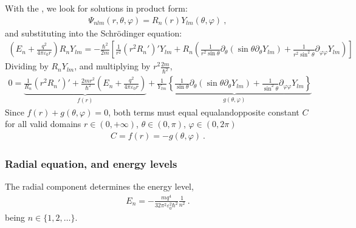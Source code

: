 \documentclass[letterpaper,10pt,english]{jupyterBook}
\begin{document}
\sphinxAtStartPar
With the , we look for solutions in product form:
\begin{equation*}
\begin{split}\Psi_{nlm}(r, \theta, \varphi) = R_n(r) Y_{lm}(\theta, \varphi) \ ,\end{split}
\end{equation*}
\sphinxAtStartPar
and substituting into the Schrödinger equation:
\begin{equation*}
\begin{split}\left( E_n + \frac{q^2}{4\pi \varepsilon_0 r} \right) R_n Y_{lm} = - \frac{\hbar^2}{2m} \left[ \frac{1}{r^2} \left( r^2 R_n' \right)' Y_{lm} + R_n \left( \frac{1}{r^2 \sin\theta} \partial_\theta \left( \sin\theta \partial_\theta Y_{lm} \right) + \frac{1}{r^2 \sin^2\theta} \partial_{\varphi\varphi} Y_{lm} \right) \right]\end{split}
\end{equation*}
\sphinxAtStartPar
Dividing by \(R_n Y_{lm}\), and multiplying by \(r^2 \frac{2m}{\hbar^2}\),
\begin{equation*}
\begin{split}0 = \underbrace{\frac{1}{R_n} (r^2 R_n')' + \frac{2m r^2}{\hbar^2} \left( E_n + \frac{q^2}{4\pi \varepsilon_0 r} \right)}_{f(r)} + \underbrace{\frac{1}{Y_{lm}} \left\{ \frac{1}{\sin\theta} \partial_\theta (\sin\theta \partial_\theta Y_{lm}) + \frac{1}{\sin^2\theta} \partial_{\varphi\varphi} Y_{lm} \right\}}_{g(\theta, \varphi)}\end{split}
\end{equation*}
\sphinxAtStartPar
Since \(f(r) + g(\theta, \varphi) = 0\), both terms must equal equal\sphinxhyphen{}and\sphinxhyphen{}opposite constant \(C\) for all valid domains \(r \in (0, +\infty)\), \(\theta \in (0, \pi)\), \(\varphi \in (0, 2\pi)\)
\begin{equation*}
\begin{split}C = f(r) = - g(\theta, \varphi) \ .\end{split}
\end{equation*}\subsubsection*{Radial equation, and energy levels}

\sphinxAtStartPar
The radial component determines the energy level,
\begin{equation}\label{equation:ch/quantum-mechanics/atom-models/schrodinger-analytical-sln:eq:atom:schrodinger:energy}
\begin{split}E_n = - \frac{m q^4}{32 \pi^2 \varepsilon_0^2 \hbar^2} \frac{1}{n^2} \ .\end{split}
\end{equation}
\sphinxAtStartPar
being \(n \in \{ 1, 2, \dots \}\).
\end{document}
